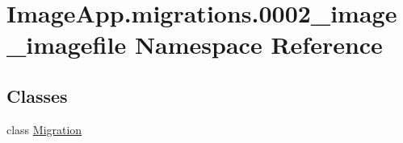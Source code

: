 \hypertarget{namespace_image_app_1_1migrations_1_10002__image__imagefile}{}\section{Image\+App.\+migrations.0002\+\_\+image\+\_\+imagefile Namespace Reference}
\label{namespace_image_app_1_1migrations_1_10002__image__imagefile}
\subsection*{Classes}
\begin{DoxyCompactItemize}
\item 
class \mbox{\hyperlink{class_image_app_1_1migrations_1_10002__image__imagefile_1_1_migration}{Migration}}
\end{DoxyCompactItemize}
